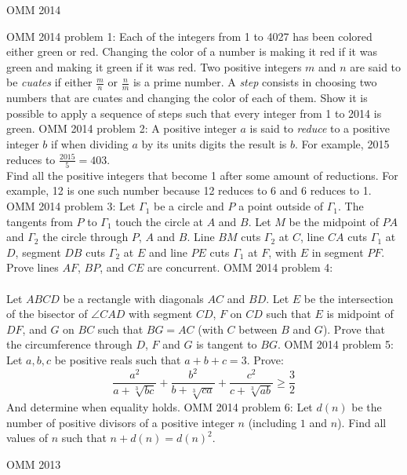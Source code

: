 OMM 2014 

OMM 2014 problem 1:  Each of the integers from 1 to 4027 has been colored either green or red. Changing the color of a number is making it red  if it was green and making it green if it was red. Two positive integers $m$ and $n$ are said to be \textit{cuates} if either $\frac{m}{n}$ or $\frac{n}{m}$ is a prime number. A \textit{step} consists in choosing two numbers that are cuates and changing the color of each of them. Show it is possible to apply a sequence of steps such that every integer from 1 to 2014 is green. 
OMM 2014 problem 2:  A positive integer $a$ is said to \textit{reduce} to a positive integer $b$ if when dividing $a$ by its units digits the result is $b$. For example, 2015 reduces to $\frac{2015}{5} = 403$. \\
Find all the positive integers that become 1 after some amount of reductions. For example, 12 is one such number because 12 reduces to 6 and 6 reduces to 1. 
OMM 2014 problem 3:  Let $\Gamma_1$ be a circle and $P$ a point outside of $\Gamma_1$. The tangents from $P$ to $\Gamma_1$ touch the circle at $A$ and $B$. Let $M$ be the midpoint of $PA$ and $\Gamma_2$ the circle through $P$, $A$ and $B$. Line $BM$ cuts $\Gamma_2$ at $C$, line $CA$ cuts $\Gamma_1$ at $D$, segment $DB$ cuts $\Gamma_2$ at $E$ and line $PE$ cuts $\Gamma_1$ at $F$, with $E$ in segment $PF$. Prove lines $AF$, $BP$, and $CE$ are concurrent. 
OMM 2014 problem 4:  \\\\
Let $ABCD$ be a rectangle with diagonals $AC$ and $BD$. Let $E$ be the intersection of the bisector of $\angle CAD$ with segment $CD$, $F$ on $CD$ such that $E$ is midpoint of $DF$, and $G$ on $BC$ such that $BG = AC$ (with $C$ between $B$ and $G$). Prove that the circumference through $D$, $F$ and $G$ is tangent to $BG$. 
OMM 2014 problem 5:  Let $a, b, c$ be positive reals such that $a + b + c = 3$. Prove:
\[
\frac{a^2}{a + \sqrt[3]{bc}} + \frac{b^2}{b + \sqrt[3]{ca}} + \frac{c^2}{c + \sqrt[3]{ab}} \geq \frac{3}{2}
\]
And determine when equality holds. 
OMM 2014 problem 6:  Let $d(n)$ be the number of positive divisors of a positive integer $n$ (including $1$ and $n$). Find all values of $n$ such that $n + d(n) = d(n)^2$. 

OMM 2013 

